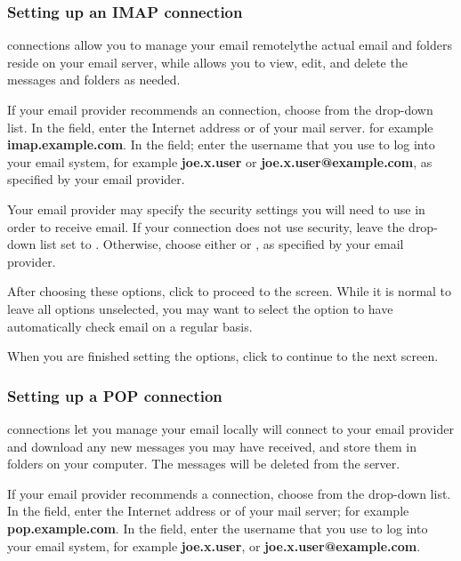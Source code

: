 \subsubsection{Setting up an IMAP connection}

 connections allow you to manage your email remotely\dash the actual
email and folders reside on your email server, while  allows you 
to view, edit, and delete the messages and folders as needed. 

If your email provider recommends an  connection, choose
 from the  drop-down list. In the 
 field, enter the Internet address or  of your mail server.
for example \textbf{imap.example.com}. In the  field;
enter the username that you use to log into your email system, for example
\textbf{joe.x.user} or \textbf{joe.x.user@example.com}, as specified by your email provider.

Your email provider may specify the security settings you will need to use
in order to receive email. If your connection does not use security, leave
the  drop-down list set to .
Otherwise, choose either  or , as specified by your email provider. 

After choosing these options, click  to proceed 
to the  screen. While it is normal to leave all options
unselected, you may want to select the 
option to have  automatically check email on a regular basis.

When you are finished setting the options, click 
to continue to the next screen.

\subsubsection{Setting up a POP connection}

 connections let you manage your email locally\dash {} will connect
to your email provider and download any new messages you may have received,
and store them in folders on your computer. The messages will be deleted from
the server.

If your email provider recommends a  connection, choose
 from the  drop-down list. In the 
 field, enter the Internet address or  of your mail server;
for example \textbf{pop.example.com}. In the  field,
enter the username that you use to log into your email system, for example
\textbf{joe.x.user}, or \textbf{joe.x.user@example.com}.

